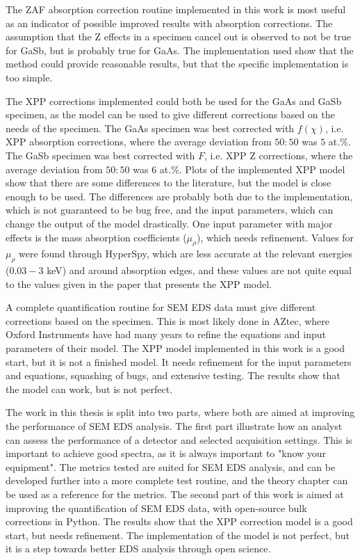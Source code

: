 The ZAF absorption correction routine implemented in this work is most useful as an indicator of possible improved results with absorption corrections.
The assumption that the Z effects in a specimen cancel out is observed to not be true for GaSb, but is probably true for GaAs.
The implementation used show that the method could provide reasonable results, but that the specific implementation is too simple.

The XPP corrections implemented could both be used for the GaAs and GaSb specimen, as the model can be used to give different corrections based on the needs of the specimen.
The GaAs specimen was best corrected with $f(\chi)$, i.e. XPP absorption corrections, where the average deviation from $50:50$ was $5$ at.\%.
The GaSb specimen was best corrected with $F$, i.e. XPP Z corrections, where the average deviation from $50:50$ was $6$ at.\%.
Plots of the implemented XPP model show that there are some differences to the literature, but the model is close enough to be used.
The differences are probably both due to the implementation, which is not guaranteed to be bug free, and the input parameters, which can change the output of the model drastically.
One input parameter with major effects is the mass absorption coefficients ($\mu_\rho$), which needs refinement.
Values for $\mu_\rho$ were found through HyperSpy, which are less accurate at the relevant energies ($0.03-3$ keV) and around absorption edges, and these values are not quite equal to the values given in the paper that presents the XPP model.


A complete quantification routine for SEM EDS data must give different corrections based on the specimen.
This is most likely done in AZtec, where Oxford Instruments have had many years to refine the equations and input parameters of their model.
The XPP model implemented in this work is a good start, but it is not a finished model. 
It needs refinement for the input parameters and equations, squashing of bugs, and extensive testing.
The results show that the model can work, but is not perfect.



The work in this thesis is split into two parts, where both are aimed at improving the performance of SEM EDS analysis.
The first part illustrate how an analyst can assess the performance of a detector and selected acquisition settings.
This is important to achieve good spectra, as it is always important to "know your equipment".
The metrics tested are suited for SEM EDS analysis, and can be developed further into a more complete test routine, and the theory chapter can be used as a reference for the metrics.
The second part of this work is aimed at improving the quantification of SEM EDS data, with open-source bulk corrections in Python.
The results show that the XPP correction model is a good start, but needs refinement.
The implementation of the model is not perfect, but it is a step towards better EDS analysis through open science.
